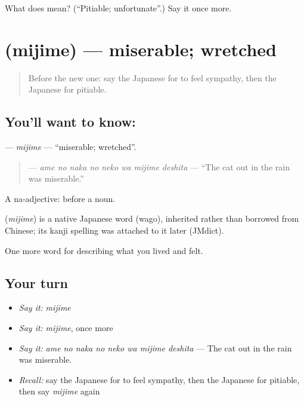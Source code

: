 \begin{tcolorbox}[breakable,colback=teal!4,colframe=teal!35!black,title={Before you move on}]
What does  mean? (\textquotedblleft{}Pitiable; unfortunate\textquotedblright{}.) Say it once more.
\end{tcolorbox}
\section[\texorpdfstring{\ja{みじめ} (mijime)}{みじめ (mijime)}]{ (mijime) — miserable; wretched}

\label{lesson:JA-C434-mijime}



\begin{quote}
Before the new one: say the Japanese for to feel sympathy, then the Japanese for pitiable.
\end{quote}

\subsection*{You'll want to know: }
\textbf{} — \emph{mijime} — \textquotedblleft{}miserable; wretched\textquotedblright{}.

\begin{quote}
\textbf{   } — \emph{ame no naka no neko wa mijime deshita} — \textquotedblleft{}The cat out in the rain was miserable.\textquotedblright{}
\end{quote}

A na-adjective:  before a noun.

\begin{cousinweb}
\textbf{} (\emph{mijime}) is a native Japanese word (wago), inherited rather than borrowed from Chinese; its kanji spelling was attached to it later (JMdict).
\end{cousinweb}

\begin{grammarlens}[title={What you've built}]
One more word for describing what you lived and felt.
\end{grammarlens}

\subsection*{Your turn}
\begin{itemize}
\raggedright
  \item \emph{Say it:} \emph{mijime}
  \item \emph{Say it:} \emph{mijime}, once more
  \item \emph{Say it:} \emph{ame no naka no neko wa mijime deshita} — The cat out in the rain was miserable.
  \item \emph{Recall:} say the Japanese for to feel sympathy, then the Japanese for pitiable, then say \emph{mijime} again
\end{itemize}

